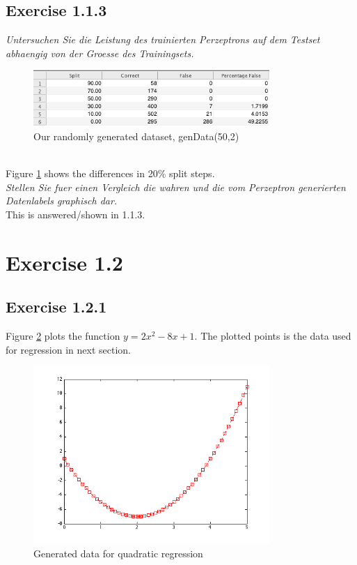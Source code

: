 \documentclass[12pt]{article}
\begin{document}
\subsection{Exercise 1.1.3}
\textit{Untersuchen Sie die Leistung des trainierten Perzeptrons auf dem Testset abhaengig von der Groesse des Trainingsets.}
\\
\begin{figure}[htp]
	\centering
	\includegraphics[width=0.8\textwidth]{ab1_1_3}
	\caption{Our randomly generated dataset, genData(50,2)}
	\label{fig:diff}
\end{figure}
\\
Figure \ref{fig:diff} shows the differences in 20\% split steps.
\\

\textit{Stellen Sie fuer einen Vergleich die wahren und die vom Perzeptron generierten Datenlabels graphisch dar.}
\\
This is answered/shown in 1.1.3.

\section{Exercise 1.2}
\subsection{Exercise 1.2.1}

Figure \ref{fig:dataQuadReg} plots the function $y=2x^2 - 8x + 1$. The plotted points is the data used for regression in next section.

\begin{figure}[htp]
	\centering
	\includegraphics[width=0.8\textwidth]{ab1_2_1.png}
	\caption{Generated data for quadratic regression}
	\label{fig:dataQuadReg}
\end{figure}
\end{document}

